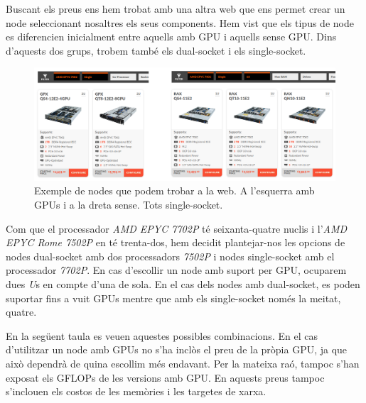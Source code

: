 Buscant els preus ens hem trobat amb una altra web \cite{webnodes} que ens permet crear un node seleccionant nosaltres els seus components. Hem vist que els tipus de node es diferencien inicialment entre aquells amb GPU i aquells sense GPU. Dins d'aquests dos grups, trobem també els dual-socket i els single-socket.

\begin{figure}[H]
    \centering
    \includegraphics[width=\textwidth]{img/webnodes.png}
    \caption{Exemple de nodes que podem trobar a la web. A l'esquerra amb GPUs i a la dreta sense. Tots single-socket.}
\end{figure}

Com que el processador \textit{AMD EPYC 7702P} té seixanta-quatre nuclis i l'\textit{AMD EPYC Rome 7502P} en té trenta-dos, hem decidit plantejar-nos les opcions de nodes dual-socket amb dos processadors \textit{7502P} i nodes single-socket amb el processador \textit{7702P}. En cas d'escollir un node amb suport per GPU, ocuparem dues \textit{U}s en compte d'una de sola. En el cas dels nodes amb dual-socket, es poden suportar fins a vuit GPUs mentre que amb els single-socket només la meitat, quatre.

 En la següent taula es veuen aquestes possibles combinacions. En el cas d'utilitzar un node amb GPUs no s'ha inclòs el preu de la pròpia GPU, ja que això dependrà de quina escollim més endavant. Per la mateixa raó, tampoc s'han exposat els GFLOPs de les versions amb GPU. En aquests preus tampoc s'inclouen els costos de les memòries i les targetes de xarxa.

